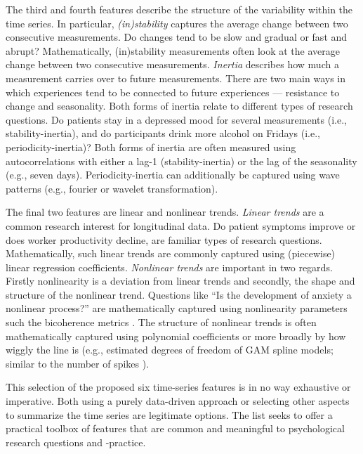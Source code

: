 \documentclass[man, 12pt, a4paper]{apa7}
\theoremstyle{break}
\theoremstyle{plain}
\begin{document}
The third and fourth features describe the structure of the variability within the time series. In particular, \textit{(in)stability} captures the average change between two consecutive measurements. Do changes tend to be slow and gradual or fast and abrupt? Mathematically, (in)stability measurements often look at the average change between two consecutive measurements. \textit{Inertia} describes how much a measurement carries over to future measurements. There are two main ways in which experiences tend to be connected to future experiences --- resistance to change and seasonality. Both forms of inertia relate to different types of research questions. Do patients stay in a depressed mood for several measurements (i.e., stability-inertia), and do participants drink more alcohol on Fridays (i.e., periodicity-inertia)? Both forms of inertia are often measured using autocorrelations with either a lag-1 (stability-inertia) or the lag of the seasonality (e.g., seven days). Periodicity-inertia can additionally be captured using wave patterns (e.g., fourier or wavelet transformation).

The final two features are linear and nonlinear trends. \textit{Linear trends} are a common research interest for longitudinal data. Do patient symptoms improve or does worker productivity decline, are familiar types of research questions. Mathematically, such linear trends are commonly captured using (piecewise) linear regression coefficients. \textit{Nonlinear trends} are important in two regards. Firstly nonlinearity is a deviation from linear trends and secondly, the shape and structure of the nonlinear trend. Questions like ``Is the development of anxiety a nonlinear process?'' are mathematically captured using nonlinearity parameters such the bicoherence metrics \citep{cuddy2009}. The structure of nonlinear trends is often mathematically captured using polynomial coefficients or more broadly by how wiggly the line is (e.g., estimated degrees of freedom of GAM spline models; similar to the number of spikes \citealp[]{caro-martin2018}). 

This selection of the proposed six time-series features is in no way exhaustive or imperative. Both using a purely data-driven approach or selecting other aspects to summarize the time series are legitimate options. The list seeks to offer a practical toolbox of features that are common and meaningful to psychological research questions and -practice.


\end{document}
